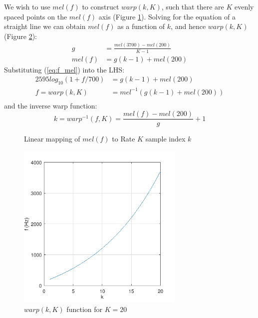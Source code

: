 \documentclass{article}
\begin{document}
We wish to use $mel(f)$ to construct $warp(k,K)$, such that there are $K$ evenly spaced points on the $mel(f)$ axis (Figure \ref{fig:mel_k}).  Solving for the equation of a straight line we can obtain $mel(f)$ as a function of $k$, and hence $warp(k,K)$ (Figure \ref{fig:warp_fhz_k}):
\begin{equation} \label{eq:mel_k}
\begin{split}
g &= \frac{mel(3700)-mel(200)}{K-1} \\
mel(f) &= g(k-1) + mel(200)
\end{split}
\end{equation}
Substituting (\ref{eq:f_mel}) into the LHS:
\begin{equation} \label{eq:warp}
\begin{split}
2595log_{10}(1+f/700) &= g(k-1) + mel(200) \\
f = warp(k,K) &= mel^{-1} ( g(k-1) + mel(200) ) \\
\end{split}
\end{equation}
and the inverse warp function:
\begin{equation} \label{warp_inv}
k = warp^{-1}(f,K) = \frac{mel(f)-mel(200)}{g} + 1
\end{equation}

\begin{figure}[h]
\caption{Linear mapping of $mel(f)$ to Rate $K$ sample index $k$}
\vspace{5mm}
\label{fig:mel_k}
\centering
{}
\end{figure}

\begin{figure}[h]
\caption{$warp(k,K)$ function for $K=20$}
\label{fig:warp_fhz_k}
\begin{center}
\includegraphics[width=8cm]{warp_fhz_k}
\end{center}
\end{figure}
\end{document}
